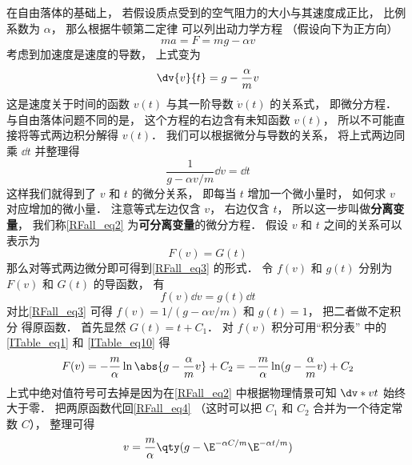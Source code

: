 

在自由落体的基础上， 若假设质点受到的空气阻力的大小与其速度成正比， 比例系数为 $\alpha$， 那么根据牛顿第二定律 可以列出动力学方程 （假设向下为正方向）
\begin{equation}
ma = F = mg - \alpha v
\end{equation}
考虑到加速度是速度的导数， 上式变为
\begin{equation}\label{RFall_eq2}
\dv{v}{t} = g - \frac{\alpha}{m} v
\end{equation}
这是速度关于时间的函数 $v(t)$ 与其一阶导数 $\dot v(t)$ 的关系式， 即微分方程． 与自由落体问题不同的是， 这个方程的右边含有未知函数 $v(t)$， 所以不可能直接将等式两边积分解得 $v(t)$． 我们可以根据微分与导数的关系， 将上式两边同乘 $\dd{t}$ 并整理得
\begin{equation}\label{RFall_eq3}
\frac{1}{g - \alpha v/m} \dd{v} = \dd{t}
\end{equation}
这样我们就得到了 $v$ 和 $t$ 的微分关系， 即每当 $t$ 增加一个微小量时， 如何求 $v$ 对应增加的微小量． 注意等式左边仅含 $v$， 右边仅含 $t$， 所以这一步叫做\textbf{分离变量}， 我们称\autoref{RFall_eq2} 为\textbf{可分离变量}的微分方程． 假设 $v$ 和 $t$ 之间的关系可以表示为
\begin{equation}\label{RFall_eq4}
F(v) = G(t)
\end{equation}
那么对等式两边微分即可得到\autoref{RFall_eq3} 的形式． 令 $f(v)$ 和 $g(t)$ 分别为 $F(v)$ 和 $G(t)$ 的导函数， 有
\begin{equation}\label{RFall_eq5}
f(v) \dd{v} = g(t) \dd{t}
\end{equation}
对比\autoref{RFall_eq3} 可得 $f(v) = 1/(g - \alpha v/m)$ 和 $g(t) = 1$， 把二者做不定积分 得原函数． 首先显然 $G(t) = t + C_1$． 对 $f(v)$ 积分可用“积分表” 中的\autoref{ITable_eq1} 和 \autoref{ITable_eq10} 得
\begin{equation}
F(v) = -\frac{m}{\alpha} \ln\abs{g - \frac{\alpha}{m} v} + C_2 = -\frac{m}{\alpha} \ln(g - \frac{\alpha}{m} v) + C_2
\end{equation}
 上式中绝对值符号可去掉是因为在\autoref{RFall_eq2} 中根据物理情景可知 $\dv*{v}{t}$ 始终大于零． 把两原函数代回\autoref{RFall_eq4} （这时可以把 $C_1$ 和 $C_2$ 合并为一个待定常数 $C$）， 整理可得
\begin{equation}
v = \frac{m}{\alpha} \qty( g - \E^{-\alpha C/m} \E^{-\alpha t/m} )
\end{equation}

